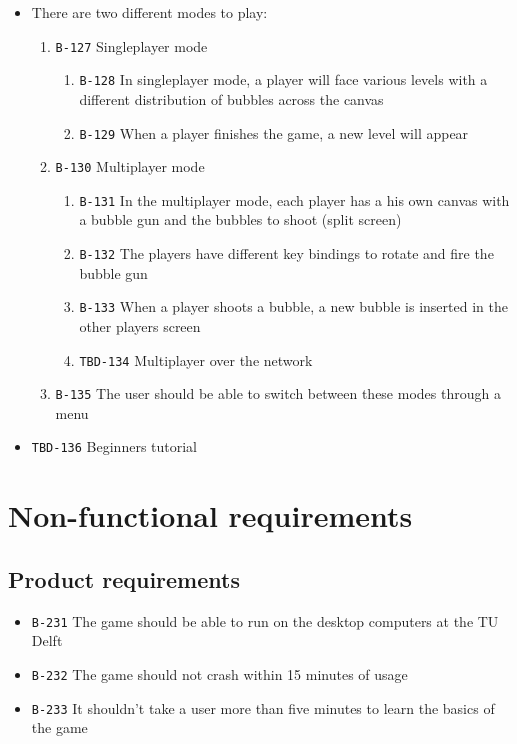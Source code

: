 \documentclass[a4paper]{article}
\begin{document}
\begin{itemize}
  \item There are two different modes to play:
  \begin{enumerate}
      \item \texttt{B-127} Singleplayer mode
      \begin{enumerate}
          \item \texttt{B-128} In singleplayer mode, a player will face various levels with a different distribution of bubbles across the canvas
          \item \texttt{B-129} When a player finishes the game, a new level will appear
      \end{enumerate}
      
      \item \texttt{B-130} Multiplayer mode
      \begin{enumerate}
          \item \texttt{B-131} In the multiplayer mode, each player has a his own canvas with a bubble gun and the bubbles to shoot (split screen)
          \item \texttt{B-132} The players have different key bindings to rotate and fire the bubble gun
          \item \texttt{B-133} When a player shoots a bubble, a new bubble is inserted in the other players screen
          \item \texttt{TBD-134} Multiplayer over the network
      \end{enumerate}
      
      \item \texttt{B-135} The user should be able to switch between these modes through a menu
  \end{enumerate}
  \item \texttt{TBD-136} Beginners tutorial
\end{itemize}

\section{Non-functional requirements}
\subsection{Product requirements}

\begin{itemize}
  \item \texttt{B-231} The game should be able to run on the desktop computers at the TU Delft
  \item \texttt{B-232} The game should not crash within 15 minutes of usage
  \item \texttt{B-233} It shouldn't take a user more than five minutes to learn the basics of the game
\end{itemize}
\end{document}
